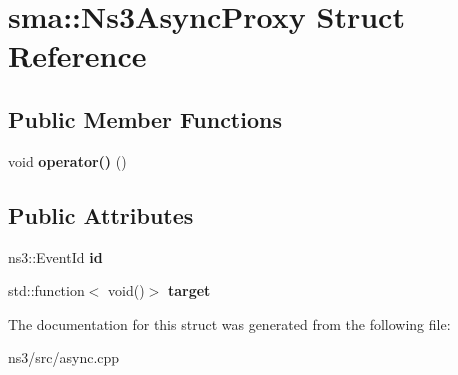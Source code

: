 \hypertarget{structsma_1_1Ns3AsyncProxy}{\section{sma\-:\-:Ns3\-Async\-Proxy Struct Reference}
\label{structsma_1_1Ns3AsyncProxy}
}
\subsection*{Public Member Functions}
\begin{DoxyCompactItemize}
\item 
\hypertarget{structsma_1_1Ns3AsyncProxy_aec89508638f43643f00e3e6af2e00e6a}{void {\bfseries operator()} ()}\label{structsma_1_1Ns3AsyncProxy_aec89508638f43643f00e3e6af2e00e6a}

\end{DoxyCompactItemize}
\subsection*{Public Attributes}
\begin{DoxyCompactItemize}
\item 
\hypertarget{structsma_1_1Ns3AsyncProxy_af24e504290490b05704bb6cb15fa914d}{ns3\-::\-Event\-Id {\bfseries id}}\label{structsma_1_1Ns3AsyncProxy_af24e504290490b05704bb6cb15fa914d}

\item 
\hypertarget{structsma_1_1Ns3AsyncProxy_ae35a52fb06e848a8e45c32d819408d11}{std\-::function$<$ void()$>$ {\bfseries target}}\label{structsma_1_1Ns3AsyncProxy_ae35a52fb06e848a8e45c32d819408d11}

\end{DoxyCompactItemize}


The documentation for this struct was generated from the following file\-:\begin{DoxyCompactItemize}
\item 
ns3/src/async.\-cpp\end{DoxyCompactItemize}
